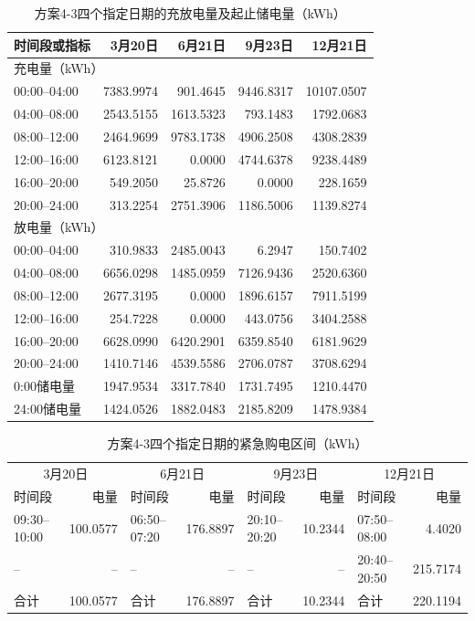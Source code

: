 \begin{table}[H]\centering\small
\caption{方案4-3四个指定日期的充放电量及起止储电量（kWh）}\label{tab:q4_4-3-storage-dates}
\begin{tabular}{lrrrr}\toprule
时间段或指标&3月20日&6月21日&9月23日&12月21日\\\midrule
\multicolumn{5}{l}{充电量（kWh）}\\
00:00--04:00&7383.9974&901.4645&9446.8317&10107.0507\\
04:00--08:00&2543.5155&1613.5323&793.1483&1792.0683\\
08:00--12:00&2464.9699&9783.1738&4906.2508&4308.2839\\
12:00--16:00&6123.8121&0.0000&4744.6378&9238.4489\\
16:00--20:00&549.2050&25.8726&0.0000&228.1659\\
20:00--24:00&313.2254&2751.3906&1186.5006&1139.8274\\
\midrule
\multicolumn{5}{l}{放电量（kWh）}\\
00:00--04:00&310.9833&2485.0043&6.2947&150.7402\\
04:00--08:00&6656.0298&1485.0959&7126.9436&2520.6360\\
08:00--12:00&2677.3195&0.0000&1896.6157&7911.5199\\
12:00--16:00&254.7228&0.0000&443.0756&3404.2588\\
16:00--20:00&6628.0990&6420.2901&6359.8540&6181.9629\\
20:00--24:00&1410.7146&4539.5586&2706.0787&3708.6294\\
\midrule
0:00储电量&1947.9534&3317.7840&1731.7495&1210.4470\\
24:00储电量&1424.0526&1882.0483&2185.8209&1478.9384\\
\bottomrule\end{tabular}\end{table}
\begin{table}[H]
\centering\small
\caption{方案4-3四个指定日期的紧急购电区间（kWh）}\label{tab:q4_4-3-emergency}
\setlength{\tabcolsep}{3pt}
\begin{tabular}{lrlrlrlr}
\toprule
\multicolumn{2}{c}{3月20日} & \multicolumn{2}{c}{6月21日} & \multicolumn{2}{c}{9月23日} & \multicolumn{2}{c}{12月21日}\\
时间段 & 电量 & 时间段 & 电量 & 时间段 & 电量 & 时间段 & 电量\\
\midrule
09:30--10:00 & 100.0577 & 06:50--07:20 & 176.8897 & 20:10--20:20 & 10.2344 & 07:50--08:00 & 4.4020\\
-- & -- & -- & -- & -- & -- & 20:40--20:50 & 215.7174\\
合计 & 100.0577 & 合计 & 176.8897 & 合计 & 10.2344 & 合计 & 220.1194\\
\bottomrule
\end{tabular}
\end{table}
